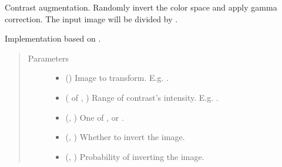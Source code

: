 \documentclass[letterpaper,10pt,english]{sphinxmanual}
\begin{document}
\begin{fulllineitems}
\label{\detokenize{data/generators/augmentors:data.generators.augmentors.contrast}}
Contrast augmentation. Randomly invert the color space and apply gamma correction. The input image will be
divided by .

Implementation based on .
\begin{quote}\begin{description}
\item[{Parameters}] \leavevmode\begin{itemize}
\item {} 
 () \textendash{} Image to transform. E.g. .

\item {} 
 ( of , ) \textendash{} Range of contrast’s intensity. E.g. .

\item {} 
 (, ) \textendash{} One of ,  or .

\item {} 
 (, ) \textendash{} Whether to invert the image.

\item {} 
 (, ) \textendash{} Probability of inverting the image.

\end{itemize}


\end{description}
\end{quote}
\end{fulllineitems}
\end{document}
